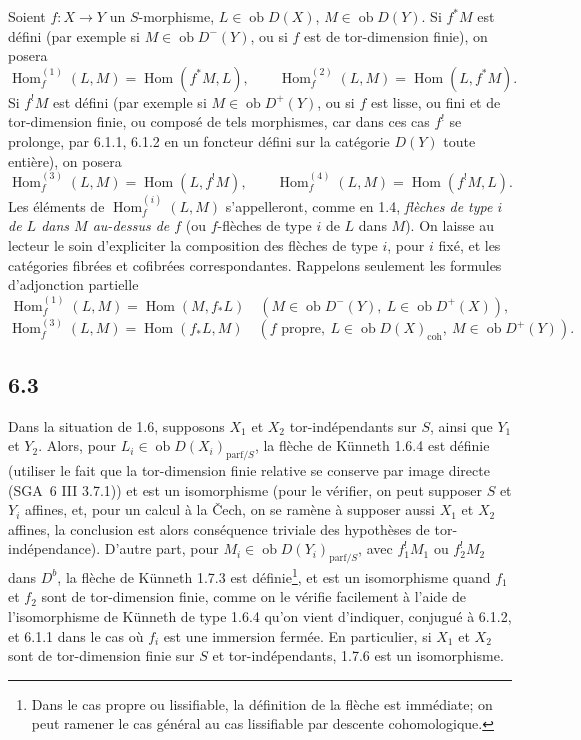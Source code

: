 \documentclass[11pt]{article}
\DeclareMathOperator{\Hom}{Hom}
\providecommand{\Hom}{\operatorname{Hom}}
\providecommand{\Hom}{\operatorname{Hom}}
\begin{document}
Soient $f:X\to Y$ un $S$-morphisme, $L\in\operatorname{ob}D(X)$, $M\in\operatorname{ob}D(Y)$. Si $f^*M$ est défini (par exemple si $M\in\operatorname{ob}D^-(Y)$, ou si $f$ est de tor-dimension finie), on posera
\[
\Hom_f^{(1)}(L,M)=\Hom(f^*M,L),\qquad
\Hom_f^{(2)}(L,M)=\Hom(L,f^*M).
\]
Si $f^!M$ est défini (par exemple si $M\in\operatorname{ob}D^+(Y)$, ou si $f$ est lisse, ou fini et de tor-dimension finie, ou composé de tels morphismes, car dans ces cas $f^!$ se prolonge, par 6.1.1, 6.1.2 en un foncteur défini sur la catégorie $D(Y)$ toute entière), on posera
\[
\Hom_f^{(3)}(L,M)=\Hom(L,f^!M),\qquad
\Hom_f^{(4)}(L,M)=\Hom(f^!M,L).
\]
Les éléments de $\Hom_f^{(i)}(L,M)$ s'appelleront, comme en 1.4, \emph{flèches de type $i$ de $L$ dans $M$ au-dessus de $f$} (ou $f$-flèches de type $i$ de $L$ dans $M$). On laisse au lecteur le soin d'expliciter la composition des flèches de type $i$, pour $i$ fixé, et les catégories fibrées et cofibrées correspondantes. Rappelons seulement les formules d'adjonction partielle
\[
\Hom_f^{(1)}(L,M)=\Hom(M,f_*L)\quad(M\in\operatorname{ob}D^{-}(Y),\ L\in\operatorname{ob}D^+(X)),
\]
\[
\Hom_f^{(3)}(L,M)=\Hom(f_*L,M)\quad(f\text{ propre},\ L\in\operatorname{ob}D(X)_{\mathrm{coh}},\ M\in\operatorname{ob}D^+(Y)).
\]

\subsection*{6.3}
Dans la situation de 1.6, supposons $X_1$ et $X_2$ tor-indépendants sur $S$, ainsi que $Y_1$ et $Y_2$. Alors, pour $L_i\in\operatorname{ob}D(X_i)_{\mathrm{parf}/S}$, la flèche de Künneth 1.6.4 est définie (utiliser le fait que la tor-dimension finie relative se conserve par image directe (SGA~6 III 3.7.1)) et est un isomorphisme (pour le vérifier, on peut supposer $S$ et $Y_i$ affines, et, pour un calcul à la Čech, on se ramène à supposer aussi $X_1$ et $X_2$ affines, la conclusion est alors conséquence triviale des hypothèses de tor-indépendance). D'autre part, pour $M_i\in\operatorname{ob}D(Y_i)_{\mathrm{parf}/S}$, avec $f_1^!M_1$ ou $f_2^!M_2$ dans $D^b$, la flèche de Künneth 1.7.3 est définie\footnote{Dans le cas propre ou lissifiable, la définition de la flèche est immédiate; on peut ramener le cas général au cas lissifiable par descente cohomologique.}, et est un isomorphisme quand $f_1$ et $f_2$ sont de tor-dimension finie, comme on le vérifie facilement à l'aide de l'isomorphisme de Künneth de type 1.6.4 qu'on vient d'indiquer, conjugué à 6.1.2, et 6.1.1 dans le cas où $f_i$ est une immersion fermée. En particulier, si $X_1$ et $X_2$ sont de tor-dimension finie sur $S$ et tor-indépendants, 1.7.6 est un isomorphisme.
\end{document}
